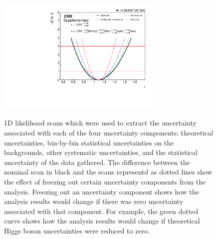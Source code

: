 \begin{figure}[htbp]
\centering
     \includegraphics[width=0.70\textwidth]{higgs_to_taus/plots/cms_output_freeze_All_Theory_bbb}\\
     \caption{
1D likelihood scans which were used to extract the uncertainty associated with each of the four uncertainty
components: theoretical uncertainties, bin-by-bin statistical uncertainties on the backgrounds, other 
systematic uncertainties, and the statistical uncertainty of the data gathered. The difference between
the nominal scan in black and the scans representd as dotted lines show the effect of freezing out certain
uncertainty components from the analysis. Freezing out an uncertainty component shows how the analysis
results would change if there was zero uncertainty associated with that component. For example, the green
dotted curve shows how the analysis results would change if theoretical Higgs boson uncertainties were
reduced to zero.
}
     \label{fig:htt_systematic_parabola}
\end{figure}



